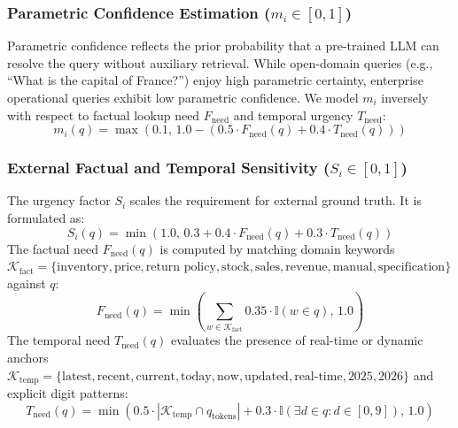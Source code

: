 \subsubsection{Parametric Confidence Estimation ($m_i \in [0, 1]$)}
Parametric confidence reflects the prior probability that a pre-trained LLM can resolve the query without auxiliary retrieval. While open-domain queries (e.g., ``What is the capital of France?'') enjoy high parametric certainty, enterprise operational queries exhibit low parametric confidence. We model $m_i$ inversely with respect to factual lookup need $F_{\text{need}}$ and temporal urgency $T_{\text{need}}$:
\begin{equation}
    m_i(q) = \max\left( 0.1, \, 1.0 - \left( 0.5 \cdot F_{\text{need}}(q) + 0.4 \cdot T_{\text{need}}(q) \right) \right)
    \label{eq:confidence_m}
\end{equation}

\subsubsection{External Factual and Temporal Sensitivity ($S_i \in [0, 1]$)}
The urgency factor $S_i$ scales the requirement for external ground truth. It is formulated as:
\begin{equation}
    S_i(q) = \min\left( 1.0, \, 0.3 + 0.4 \cdot F_{\text{need}}(q) + 0.3 \cdot T_{\text{need}}(q) \right)
    \label{eq:urgency_s}
\end{equation}
The factual need $F_{\text{need}}(q)$ is computed by matching domain keywords $\mathcal{K}_{\text{fact}} = \{\text{inventory}, \text{price}, \text{return policy}, \text{stock}, \text{sales}, \text{revenue}, \text{manual}, \text{specification}\}$ against $q$:
\begin{equation}
    F_{\text{need}}(q) = \min\left( \sum_{w \in \mathcal{K}_{\text{fact}}} 0.35 \cdot \mathbb{I}(w \in q), \, 1.0 \right)
\end{equation}
The temporal need $T_{\text{need}}(q)$ evaluates the presence of real-time or dynamic anchors $\mathcal{K}_{\text{temp}} = \{\text{latest}, \text{recent}, \text{current}, \text{today}, \text{now}, \text{updated}, \text{real-time}, \text{2025}, \text{2026}\}$ and explicit digit patterns:
\begin{equation}
    T_{\text{need}}(q) = \min\left( 0.5 \cdot |\mathcal{K}_{\text{temp}} \cap q_{\text{tokens}}| + 0.3 \cdot \mathbb{I}(\exists d \in q : d \in [0, 9]), \, 1.0 \right)
\end{equation}

